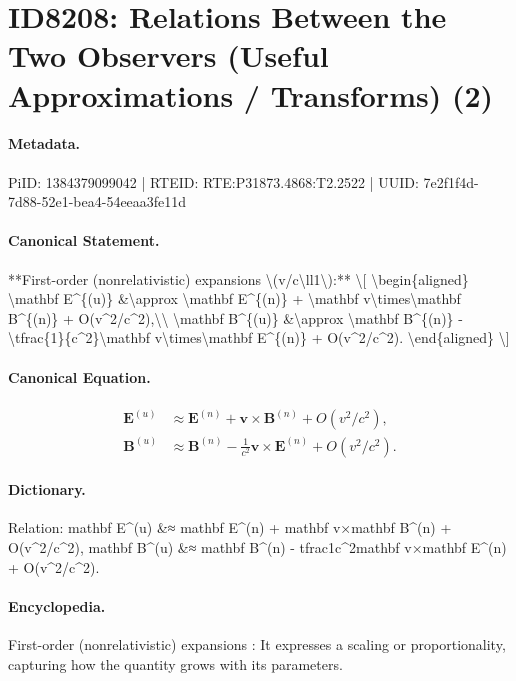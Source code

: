 \section*{ID8208: Relations Between the Two Observers (Useful Approximations / Transforms) (2)}
\paragraph{Metadata.}
PiID: 1384379099042 | RTEID: RTE:P31873.4868:T2.2522 | UUID: 7e2f1f4d-7d88-52e1-bea4-54eeaa3fe11d

\paragraph{Canonical Statement.}
**First-order (nonrelativistic) expansions \textbackslash{}(v/c\textbackslash{}ll1\textbackslash{}):** \textbackslash{}[ \textbackslash{}begin\{aligned\} \textbackslash{}mathbf E\textasciicircum{}\{(u)\} \&\textbackslash{}approx \textbackslash{}mathbf E\textasciicircum{}\{(n)\} + \textbackslash{}mathbf v\textbackslash{}times\textbackslash{}mathbf B\textasciicircum{}\{(n)\} + O(v\textasciicircum{}2/c\textasciicircum{}2),\textbackslash{}\textbackslash{} \textbackslash{}mathbf B\textasciicircum{}\{(u)\} \&\textbackslash{}approx \textbackslash{}mathbf B\textasciicircum{}\{(n)\} - \textbackslash{}tfrac\{1\}\{c\textasciicircum{}2\}\textbackslash{}mathbf v\textbackslash{}times\textbackslash{}mathbf E\textasciicircum{}\{(n)\} + O(v\textasciicircum{}2/c\textasciicircum{}2). \textbackslash{}end\{aligned\} \textbackslash{}]

\paragraph{Canonical Equation.}
\[
\begin{aligned} \mathbf E^{(u)} &\approx \mathbf E^{(n)} + \mathbf v\times\mathbf B^{(n)} + O(v^2/c^2),\\ \mathbf B^{(u)} &\approx \mathbf B^{(n)} - \tfrac{1}{c^2}\mathbf v\times\mathbf E^{(n)} + O(v^2/c^2). \end{aligned}
\]

\paragraph{Dictionary.}
Relation: mathbf E\textasciicircum{}(u) \&≈ mathbf E\textasciicircum{}(n) + mathbf v×mathbf B\textasciicircum{}(n) + O(v\textasciicircum{}2/c\textasciicircum{}2), mathbf B\textasciicircum{}(u) \&≈ mathbf B\textasciicircum{}(n) - tfrac1c\textasciicircum{}2mathbf v×mathbf E\textasciicircum{}(n) + O(v\textasciicircum{}2/c\textasciicircum{}2).

\paragraph{Encyclopedia.}
First-order (nonrelativistic) expansions : It expresses a scaling or proportionality, capturing how the quantity grows with its parameters.
